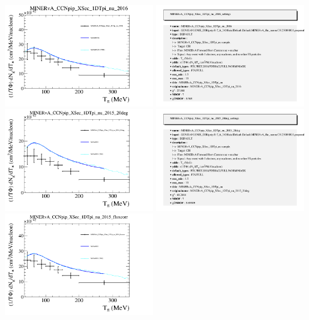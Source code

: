 \documentclass{article}
\begin{document}
\centering
\includegraphics[width=0.49\textwidth]{figures/nuisance_MINERvA_CCNpip_XSec_1DTpi_nu_2016_comp.png}
\includegraphics[width=0.49\textwidth]{figures/nuisance_MINERvA_CCNpip_XSec_1DTpi_nu_2016_info.png}
\centering
\includegraphics[width=0.49\textwidth]{figures/nuisance_MINERvA_CCNpip_XSec_1DTpi_nu_2015_20deg_comp.png}
\includegraphics[width=0.49\textwidth]{figures/nuisance_MINERvA_CCNpip_XSec_1DTpi_nu_2015_20deg_info.png}
\centering
\includegraphics[width=0.49\textwidth]{figures/nuisance_MINERvA_CCNpip_XSec_1DTpi_nu_2015_fluxcorr_comp.png}
\end{document}
